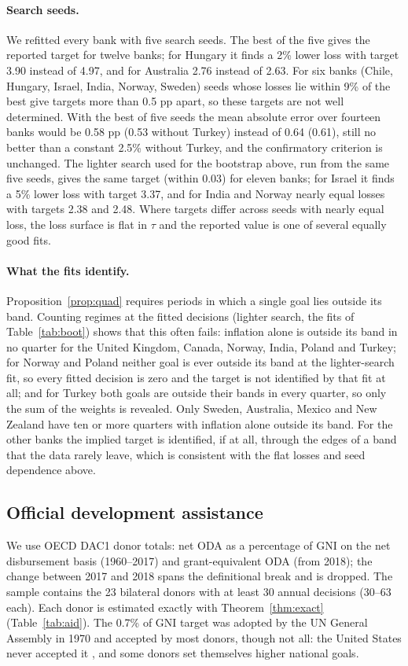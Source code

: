 \documentclass[pdflatex,sn-basic]{sn-jnl}
\theoremstyle{thmstyleone}\newtheorem{proposition}{Proposition}\newtheorem{theorem}{Theorem}
\theoremstyle{thmstylethree}\newtheorem{remark}{Remark}
\begin{document}
\paragraph{Search seeds.} We refitted every bank with five search seeds. The best of the five gives the reported target for twelve banks; for Hungary it finds a 2\% lower loss with target 3.90 instead of 4.97, and for Australia 2.76 instead of 2.63. For six banks (Chile, Hungary, Israel, India, Norway, Sweden) seeds whose losses lie within 9\% of the best give targets more than 0.5 pp apart, so these targets are not well determined. With the best of five seeds the mean absolute error over fourteen banks would be 0.58 pp (0.53 without Turkey) instead of 0.64 (0.61), still no better than a constant 2.5\% without Turkey, and the confirmatory criterion is unchanged. The lighter search used for the bootstrap above, run from the same five seeds, gives the same target (within 0.03) for eleven banks; for Israel it finds a 5\% lower loss with target 3.37, and for India and Norway nearly equal losses with targets 2.38 and 2.48. Where targets differ across seeds with nearly equal loss, the loss surface is flat in $\tau$ and the reported value is one of several equally good fits.

\paragraph{What the fits identify.} Proposition~\ref{prop:quad} requires periods in which a single goal lies outside its band. Counting regimes at the fitted decisions (lighter search, the fits of Table~\ref{tab:boot}) shows that this often fails: inflation alone is outside its band in no quarter for the United Kingdom, Canada, Norway, India, Poland and Turkey; for Norway and Poland neither goal is ever outside its band at the lighter-search fit, so every fitted decision is zero and the target is not identified by that fit at all; and for Turkey both goals are outside their bands in every quarter, so only the sum of the weights is revealed. Only Sweden, Australia, Mexico and New Zealand have ten or more quarters with inflation alone outside its band. For the other banks the implied target is identified, if at all, through the edges of a band that the data rarely leave, which is consistent with the flat losses and seed dependence above.

\subsection{Official development assistance}\label{sec:aid}
We use OECD DAC1 donor totals: net ODA as a percentage of GNI on the net disbursement basis (1960--2017) and grant-equivalent ODA (from 2018); the change between 2017 and 2018 spans the definitional break and is dropped. The sample contains the 23 bilateral donors with at least 30 annual decisions (30--63 each). Each donor is estimated exactly with Theorem~\ref{thm:exact} (Table~\ref{tab:aid}). The 0.7\% of GNI target was adopted by the UN General Assembly in 1970 and accepted by most donors, though not all: the United States never accepted it \citep{clemens2007}, and some donors set themselves higher national goals.
\end{document}
